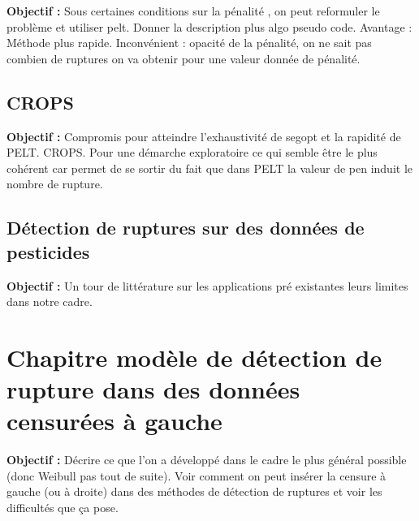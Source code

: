 \documentclass[12pt, twoside]{report}
\begin{document}
\textbf{Objectif :} Sous certaines conditions sur la pénalité , on peut reformuler le problème et utiliser pelt. Donner la description plus algo pseudo code. Avantage : Méthode plus rapide. Inconvénient : opacité de la pénalité, on ne sait pas combien de ruptures on va obtenir pour une valeur donnée de pénalité.


\section{CROPS}


\textbf{Objectif :} Compromis pour atteindre l'exhaustivité de segopt et la rapidité de PELT. CROPS. Pour une démarche exploratoire ce qui semble être le plus cohérent car permet de se sortir du fait que dans PELT la valeur de pen induit le nombre de rupture.  

\section{Détection de ruptures sur des données de pesticides}

\textbf{Objectif :} Un tour de littérature sur les applications pré existantes leurs limites dans notre cadre.

\chapter{Chapitre modèle de détection de rupture dans des données censurées à gauche}

\textbf{Objectif :} Décrire ce que l'on a développé dans le cadre le plus général possible (donc Weibull pas tout de suite). Voir comment on peut insérer la censure à gauche (ou à droite) dans des méthodes de détection de ruptures et voir les difficultés que ça pose.
\end{document}
